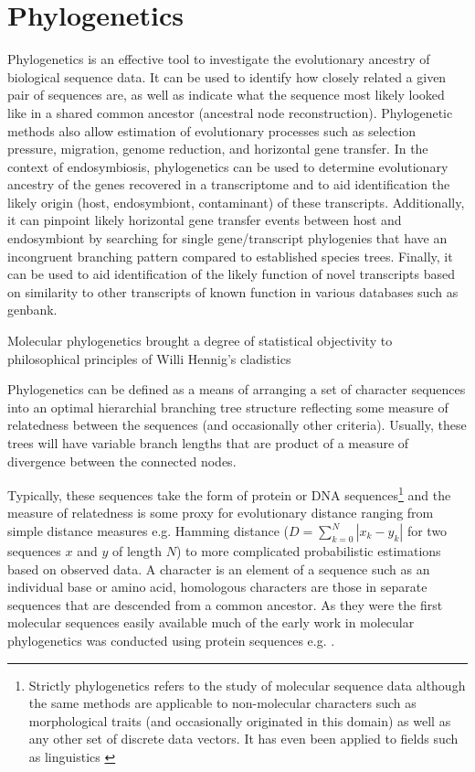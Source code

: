 \section{Phylogenetics}

Phylogenetics is an effective tool to investigate the evolutionary ancestry of biological sequence data.
It can be used to identify how closely related a given pair of sequences are, as
well as indicate what the sequence most likely looked like in a shared common
ancestor (ancestral node reconstruction). Phylogenetic methods also allow estimation
of evolutionary processes such as selection pressure,
migration, genome reduction, and horizontal gene transfer.
In the context of endosymbiosis, phylogenetics can be used to determine evolutionary ancestry of 
the genes recovered in a transcriptome and to aid identification the likely origin 
(host, endosymbiont, contaminant) of these transcripts. Additionally, it can pinpoint
likely horizontal gene transfer events between host and endosymbiont by searching for single 
gene/transcript phylogenies that have an incongruent branching pattern
compared to established species trees.  Finally, it can be used to aid identification of the likely function 
of novel transcripts based on similarity to other transcripts of known function in various
databases such as genbank.

Molecular phylogenetics brought a degree of statistical objectivity to philosophical principles of Willi Hennig's cladistics \citep{Felsenstein2001}


Phylogenetics can be defined as a means of arranging a set of character sequences into an optimal hierarchial
branching tree structure reflecting some measure of relatedness 
between the sequences (and occasionally other criteria). Usually, these trees will have variable
branch lengths that are product of a measure of divergence between the connected nodes.

Typically, these sequences take the form of protein or DNA sequences\footnote{
Strictly phylogenetics refers to the study of molecular sequence data although the same methods are applicable to
non-molecular characters such as morphological traits (and occasionally originated in this domain) as well as any
other set of discrete data vectors. It has even been applied to fields such as linguistics \citep{}
} and the measure of relatedness is some proxy for evolutionary distance ranging from simple distance measures 
e.g. Hamming distance (\(D = \sum_{k=0}^{N}|x_{k} - y_{k}|\) for two sequences \(x\) and \(y\) of length \(N\))
to more complicated probabilistic estimations based on observed data.
A character is an element of a sequence such as an individual base or amino acid, homologous 
characters are those in separate sequences that are descended from a common ancestor.  
As they were the first molecular sequences easily available much of the early work in molecular phylogenetics
was conducted using protein sequences e.g. \citep{eck1966atlas,Fitch1967}.

